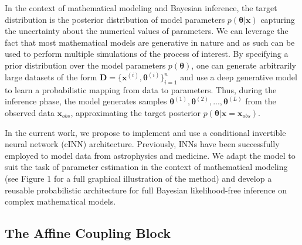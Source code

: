 \documentclass[9pt,twoside,lineno]{pnas-new}
\begin{document}
In the context of mathematical modeling and Bayesian inference, the target distribution is the posterior distribution of model parameters $p(\boldsymbol{\theta}|\boldsymbol{x})$ capturing the uncertainty about the numerical values of parameters. We can leverage the fact that most mathematical models are generative in nature and as such can be used to perform multiple simulations of the process of interest. By specifying a prior distribution over the model parameters $p(\boldsymbol{\theta})$, one can generate arbitrarily large datasets of the form $\boldsymbol{D} = \{\boldsymbol{x}^{(i)}, \boldsymbol{\theta}^{(i)}\}_{i=1}^{n}$ and use a deep generative model to learn a probabilistic mapping from data to parameters. Thus, during the inference phase, the model generates samples $\boldsymbol{\theta}^{(1)}, \boldsymbol{\theta}^{(2)},...,\boldsymbol{\theta}^{(L)}$ from the observed data $\boldsymbol{x}_{obs}$, approximating the target posterior $p(\boldsymbol{\theta}|\boldsymbol{x}=\boldsymbol{x}_{obs})$.

In the current work, we propose to implement and use a conditional invertible neural network (cINN) architecture. Previously, INNs have been successfully employed to model data from astrophysics and medicine\cite{ardizzone2018analyzing}. We adapt the model to suit the task of parameter estimation in the context of mathematical modeling (see Figure 1 for a full graphical illustration of the method) and develop a reusable probabilistic architecture for full Bayesian likelihood-free inference on complex mathematical models.

\subsection*{The Affine Coupling Block}
\end{document}

